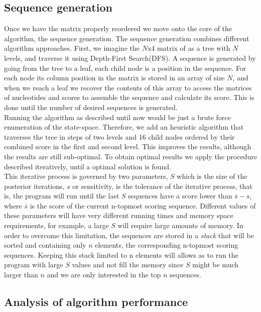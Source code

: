 \documentclass[10pt]{article}
\begin{document}
\subsection{Sequence generation}

Once we have the matrix properly reordered we move onto the core of the algorithm, the sequence generation. The sequence generation combines different algorithm approaches. First, we imagine the $N$x4 matrix of  as a tree with $N$ levels, and traverse it using Depth-First Search(DFS). A sequence is generated by going from the tree to a leaf, each child node is a position in the sequence. For each node its column position in the matrix is stored in an array of size $N$, and when we reach a leaf we recover the contents of this array to access the matrices of nucleotides and scores to assemble the sequence and calculate its score. This is done until the number of desired sequences is generated.\\

Running  the algorithm as described until now would be just a brute force enumeration of the state-space. Therefore, we add an heuristic algorithm that traverses the tree in steps of two levels and 16 child nodes ordered by their combined score in the first and second level. This improves the results, although the results are still sub-optimal. To obtain optimal results we apply the procedure described iteratively, until a optimal solution is found.\\

This iterative process is governed by two parameters, $S$ which is the size of the posterior iterations, $s$ or sensitivity, is the tolerance of the iterative process, that is, the program will run until the last $S$ sequences have a score lower than $\bar{s}-s$, where $\bar{s}$ is the score of the current n-topmost scoring sequence. Different values of these parameters will have very different running times and memory space requirements, for example, a large $S$ will require large amounts of memory. In order to overcome this limitation, the sequences are stored in a \textit{stack} that will be sorted and containing only $n$ elements, the corresponding n-topmost scoring sequences. Keeping this stack limited to n elements will allows as to run the program with large $S$ values and not fill the memory since $S$ might be much larger than $n$ and we are only interested in the top $n$ sequences.\\

\subsection{Analysis of algorithm performance}
\end{document}
